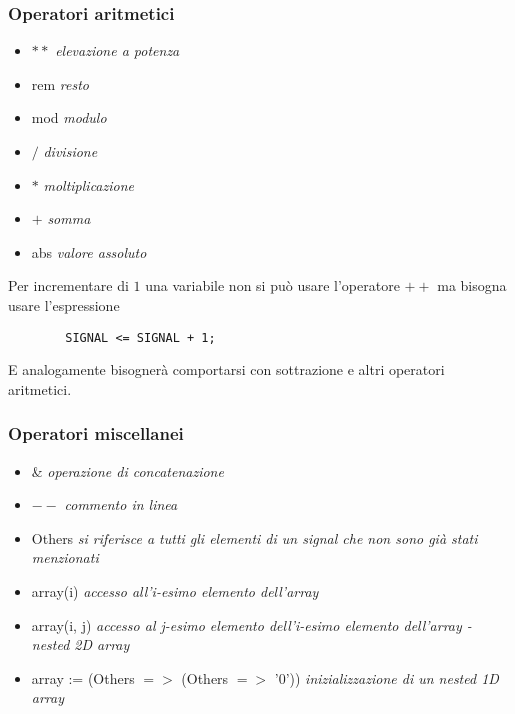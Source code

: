 \documentclass{article}
\begin{document}
\subsubsection{Operatori aritmetici}
\begin{itemize}
	\item \(**\) \textit{elevazione a potenza}
	\item rem \textit{resto}
	\item mod \textit{modulo}
	\item \(/\) \textit{divisione}
	\item \(*\) \textit{moltiplicazione}
	\item \(+\) \textit{somma}
	\item abs \textit{valore assoluto}
	      	
\end{itemize}
Per incrementare di \(1\) una variabile non si può usare l'operatore \(++\) ma bisogna usare l'espressione
\begin{verbatim}
	    SIGNAL <= SIGNAL + 1;
\end{verbatim}
E analogamente bisognerà comportarsi con sottrazione e altri operatori aritmetici.
\subsubsection{Operatori miscellanei}
\begin{itemize}
	\item \& \textit{operazione di concatenazione}
	\item \(--\) \textit{commento in linea}
	\item Others \textit{si riferisce a tutti gli elementi di un signal che non sono già stati menzionati}
	\item array(i) \textit{accesso all'i-esimo elemento dell'array}
	\item array(i, j) \textit{accesso al j-esimo elemento dell'i-esimo elemento dell'array - nested 2D array}
	\item array := (Others \( => \) (Others \( => \) '0')) \textit{inizializzazione di un nested 1D array}
\end{itemize}
	
\newpage
\end{document}
